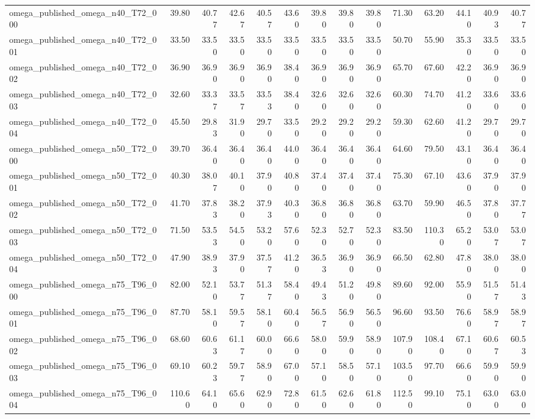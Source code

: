 \begin{table}[htbp]
\begin{tabular}{lrrrrrrrrrrrrr}
omega\_published\_omega\_n40\_T72\_000 & 39.80 & 40.77 & 42.67 & 40.57 & 43.60 & 39.80 & 39.80 & 39.80 & 71.30 & 63.20 & 44.10 & 40.93 & 40.77 \\
omega\_published\_omega\_n40\_T72\_001 & 33.50 & 33.50 & 33.50 & 33.50 & 33.50 & 33.50 & 33.50 & 33.50 & 50.70 & 55.90 & 35.30 & 33.50 & 33.50 \\
omega\_published\_omega\_n40\_T72\_002 & 36.90 & 36.90 & 36.90 & 36.90 & 38.40 & 36.90 & 36.90 & 36.90 & 65.70 & 67.60 & 42.20 & 36.90 & 36.90 \\
omega\_published\_omega\_n40\_T72\_003 & 32.60 & 33.37 & 33.57 & 33.53 & 38.40 & 32.60 & 32.60 & 32.60 & 60.30 & 74.70 & 41.20 & 33.60 & 33.60 \\
omega\_published\_omega\_n40\_T72\_004 & 45.50 & 29.83 & 31.90 & 29.70 & 33.50 & 29.20 & 29.20 & 29.20 & 59.30 & 62.60 & 41.20 & 29.70 & 29.70 \\
omega\_published\_omega\_n50\_T72\_000 & 39.70 & 36.40 & 36.40 & 36.40 & 44.00 & 36.40 & 36.40 & 36.40 & 64.60 & 79.50 & 43.10 & 36.40 & 36.40 \\
omega\_published\_omega\_n50\_T72\_001 & 40.30 & 38.07 & 40.10 & 37.90 & 40.80 & 37.40 & 37.40 & 37.40 & 75.30 & 67.10 & 43.60 & 37.90 & 37.90 \\
omega\_published\_omega\_n50\_T72\_002 & 41.70 & 37.83 & 38.20 & 37.93 & 40.30 & 36.80 & 36.80 & 36.80 & 63.70 & 59.90 & 46.50 & 37.80 & 37.77 \\
omega\_published\_omega\_n50\_T72\_003 & 71.50 & 53.53 & 54.50 & 53.20 & 57.60 & 52.30 & 52.70 & 52.30 & 83.50 & 110.30 & 65.20 & 53.07 & 53.07 \\
omega\_published\_omega\_n50\_T72\_004 & 47.90 & 38.93 & 37.90 & 37.57 & 41.20 & 36.53 & 36.90 & 36.90 & 66.50 & 62.80 & 47.80 & 38.00 & 38.00 \\
omega\_published\_omega\_n75\_T96\_000 & 82.00 & 52.10 & 53.77 & 51.37 & 58.40 & 49.43 & 51.20 & 49.80 & 89.60 & 92.00 & 55.90 & 51.57 & 51.43 \\
omega\_published\_omega\_n75\_T96\_001 & 87.70 & 58.10 & 59.57 & 58.10 & 60.40 & 56.57 & 56.90 & 56.50 & 96.60 & 93.50 & 76.60 & 58.97 & 58.97 \\
omega\_published\_omega\_n75\_T96\_002 & 68.60 & 60.63 & 61.17 & 60.00 & 66.60 & 58.00 & 59.90 & 58.90 & 107.90 & 108.40 & 67.10 & 60.67 & 60.53 \\
omega\_published\_omega\_n75\_T96\_003 & 69.10 & 60.23 & 59.77 & 58.90 & 67.00 & 57.10 & 58.50 & 57.10 & 103.50 & 97.70 & 66.60 & 59.90 & 59.90 \\
omega\_published\_omega\_n75\_T96\_004 & 110.60 & 64.10 & 65.60 & 62.90 & 72.80 & 61.50 & 62.60 & 61.80 & 112.50 & 99.10 & 75.10 & 63.00 & 63.00 \\
\bottomrule
\end{tabular}
\end{table}
